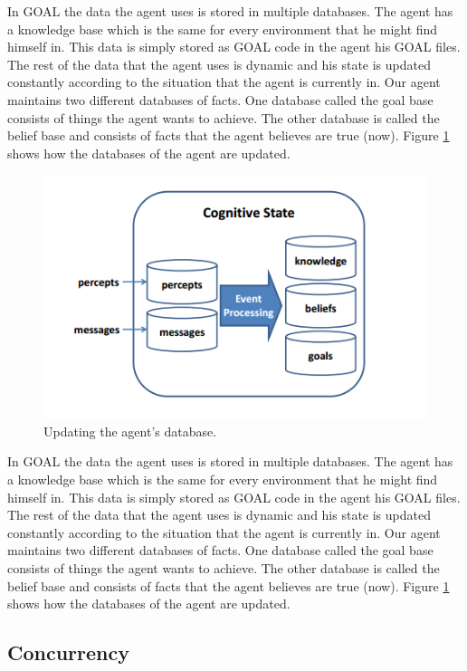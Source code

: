 In GOAL the data the agent uses is stored in multiple databases. The agent has a knowledge base which is the same for every environment that he might find himself in. This data is simply stored as GOAL code in the agent his GOAL files. The rest of the data that the agent uses is dynamic and his state is updated constantly according to the situation that the agent is currently in. Our agent maintains two different databases of facts. One database called the goal base consists of things the agent wants to achieve. The other database is called the belief base and consists of facts that the agent believes are true (now).  Figure \ref{fig:agentstate1} shows how the databases of the agent are updated.

\begin{figure}[h!]
  \includegraphics[width=\linewidth]{agentstate.png}
  \caption{Updating the agent's database.}
  \label{fig:agentstate1}
\end{figure}
In GOAL the data the agent uses is stored in multiple databases. The agent has a knowledge base which is the same for every environment that he might find himself in. This data is simply stored as GOAL code in the agent his GOAL files. The rest of the data that the agent uses is dynamic and his state is updated constantly according to the situation that the agent is currently in. Our agent maintains two different databases of facts. One database called the goal base consists of things the agent wants to achieve. The other database is called the belief base and consists of facts that the agent believes are true (now).  Figure \ref{fig:agentstate1} \cite{goal} shows how the databases of the agent are updated.

\newpage
\subsection{Concurrency}





